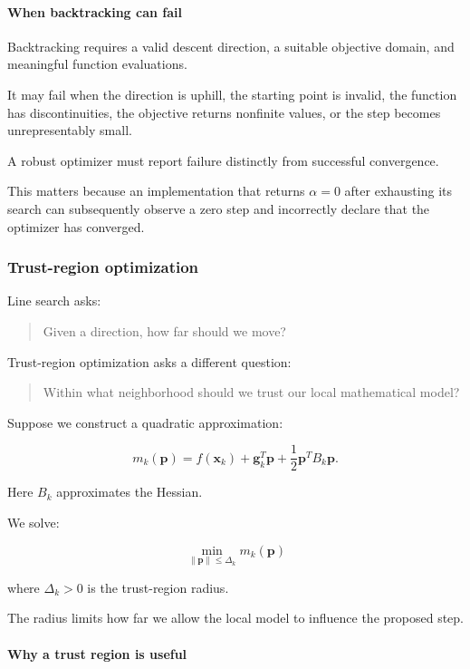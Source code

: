 \paragraph{When backtracking can fail}\label{02-foundations-ii-ch026-when-backtracking-can-fail}

Backtracking requires a valid descent direction, a suitable objective domain, and meaningful function evaluations.

It may fail when the direction is uphill, the starting point is invalid, the function has discontinuities, the objective returns nonfinite values, or the step becomes unrepresentably small.

A robust optimizer must report failure distinctly from successful convergence.

This matters because an implementation that returns \(\alpha=0\) after exhausting its search can subsequently observe a zero step and incorrectly declare that the optimizer has converged.

\subsubsection{Trust-region optimization}\label{02-foundations-ii-ch026-trust-region-optimization}

Line search asks:

\begin{quote}
Given a direction, how far should we move?
\end{quote}

Trust-region optimization asks a different question:

\begin{quote}
Within what neighborhood should we trust our local mathematical model?
\end{quote}

Suppose we construct a quadratic approximation:

\[
m_k(\mathbf p) = f(\mathbf x_k)+ \mathbf g_k^T\mathbf p+ \frac12\mathbf p^TB_k\mathbf p.
\]

Here \(B_k\) approximates the Hessian.

We solve:

\[
\boxed{ \min_{\|\mathbf p\|\le\Delta_k}m_k(\mathbf p) }
\]

where \(\Delta_k>0\) is the trust-region radius.

The radius limits how far we allow the local model to influence the proposed step.

\paragraph{Why a trust region is useful}\label{02-foundations-ii-ch026-why-a-trust-region-is-useful}

